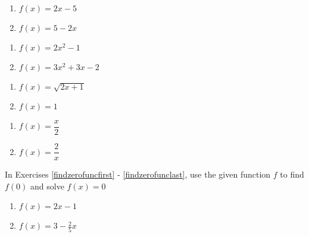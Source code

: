\begin{multicols}{2}
\begin{enumerate}
\setcounter{enumi}{\value{HW}}

\item $f(x) = 2x-5$ \label{secondfuncnotationbasicfirst}
\item $f(x) = 5-2x$

\setcounter{HW}{\value{enumi}}
\end{enumerate}
\end{multicols}

\begin{multicols}{2}
\begin{enumerate}
\setcounter{enumi}{\value{HW}}

\item $f(x) = 2x^2 - 1$
\item $f(x) = 3x^2+3x-2$

\setcounter{HW}{\value{enumi}}
\end{enumerate}
\end{multicols}
 
\begin{multicols}{2}
\begin{enumerate}
\setcounter{enumi}{\value{HW}}

\item $f(x) = \sqrt{2x+1}$
\item $f(x) = 1$

\setcounter{HW}{\value{enumi}}
\end{enumerate}
\end{multicols}

\begin{multicols}{2}
\begin{enumerate}
\setcounter{enumi}{\value{HW}}

\item $f(x) = \dfrac{x}{2}$
\item $f(x) = \dfrac{2}{x}$ \label{secondfuncnotationbasiclast}

\setcounter{HW}{\value{enumi}}
\end{enumerate}
\end{multicols}

In Exercises \ref{findzerofuncfirst} - \ref{findzerofunclast}, use the given function $f$ to find $f(0)$ and solve $f(x) = 0$

\begin{multicols}{2}
\begin{enumerate}
\setcounter{enumi}{\value{HW}}

\item $f(x) = 2x - 1$ \label{findzerofuncfirst}
\item $f(x) = 3 - \frac{2}{5} x$

\setcounter{HW}{\value{enumi}}
\end{enumerate}
\end{multicols}


